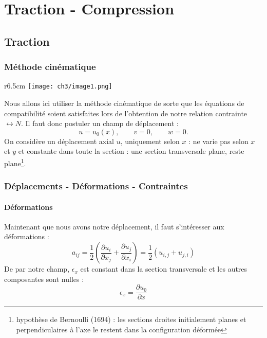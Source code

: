 \chapter{Traction - Compression}
\section{Traction}
	\subsection{Méthode cinématique}
	\begin{wrapfigure}[8]{r}{6.5cm}
	\vspace{-5mm}
	\texttt{[image: ch3/image1.png]}
	\end{wrapfigure}
	Nous allons ici utiliser la méthode cinématique de sorte que les équations 
	de compatibilité soient satisfaites lors de l'obtention de notre relation 
	contrainte $\leftrightarrow N$. Il faut donc postuler un champ de 
	déplacement :
	\begin{equation}
	u = u_0(x),\qquad v=0,\qquad w=0.
	\end{equation}
	On considère un déplacement axial $u$, uniquement selon $x$ : ne varie 
	pas selon $x$ et $y$ et constante dans toute la section : une section 
	transversale plane, reste plane\footnote{hypothèse de Bernoulli (1694) :
	les sections droites initialement planes et perpendiculaires à l'axe le 
	restent dans la configuration déformée}.
	
	\subsection{Déplacements - Déformations - Contraintes}
		\subsubsection{Déformations}
		Maintenant que nous avons notre déplacement, il faut s'intéresser 
		aux déformations :
		\begin{equation}
		a_{ij} = \frac{1}{2}\left(\dfrac{\partial u_i}{\partial x_j}+\dfrac{
		\partial u_j}{\partial x_i}\right) = \frac{1}{2}(u_{i,j}+u_{j,i})
		\end{equation}
		De par notre champ, $\epsilon_x$ est constant dans la section 
		transversale et les autres composantes sont nulles :
		\begin{equation}
		\epsilon_x = \dfrac{\partial u_0}{\partial x}
		\end{equation}
		
